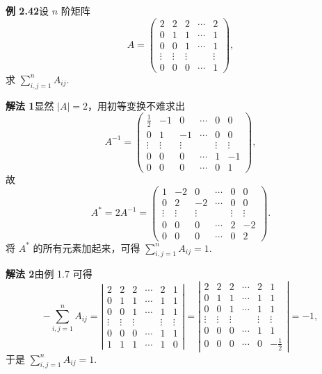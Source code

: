 \documentclass[UTF8,12pt,a4paper,fontset=fandol]{ctexart}
\begin{document}
\noindent\textbf{例 2.42}\quad 设 $n$ 阶矩阵
\[
A=
\left(
\begin{array}{ccccc}
2 & 2 & 2 & \cdots & 2\\
0 & 1 & 1 & \cdots & 1\\
0 & 0 & 1 & \cdots & 1\\
\vdots & \vdots & \vdots & & \vdots\\
0 & 0 & 0 & \cdots & 1
\end{array}
\right),
\]
求 $\sum\limits_{i,j=1}^n A_{ij}$.

\noindent\textbf{解法 1}\quad 显然 $|A|=2$，用初等变换不难求出
\[
A^{-1}=
\left(
\begin{array}{rrrrrr}
\frac12 & -1 & 0 & \cdots & 0 & 0\\
0 & 1 & -1 & \cdots & 0 & 0\\
\vdots & \vdots & \vdots & & \vdots & \vdots\\
0 & 0 & 0 & \cdots & 1 & -1\\
0 & 0 & 0 & \cdots & 0 & 1
\end{array}
\right),
\]
故
\[
A^*=2A^{-1}=
\left(
\begin{array}{rrrrrr}
1 & -2 & 0 & \cdots & 0 & 0\\
0 & 2 & -2 & \cdots & 0 & 0\\
\vdots & \vdots & \vdots & & \vdots & \vdots\\
0 & 0 & 0 & \cdots & 2 & -2\\
0 & 0 & 0 & \cdots & 0 & 2
\end{array}
\right).
\]
将 $A^*$ 的所有元素加起来，可得 $\sum\limits_{i,j=1}^n A_{ij}=1$.

\noindent\textbf{解法 2}\quad 由例 1.7 可得
\[
-\sum_{i,j=1}^n A_{ij}=
\left|
\begin{array}{cccccc}
2 & 2 & 2 & \cdots & 2 & 1\\
0 & 1 & 1 & \cdots & 1 & 1\\
0 & 0 & 1 & \cdots & 1 & 1\\
\vdots & \vdots & \vdots & & \vdots & \vdots\\
0 & 0 & 0 & \cdots & 1 & 1\\
1 & 1 & 1 & \cdots & 1 & 0
\end{array}
\right|
=
\left|
\begin{array}{cccccc}
2 & 2 & 2 & \cdots & 2 & 1\\
0 & 1 & 1 & \cdots & 1 & 1\\
0 & 0 & 1 & \cdots & 1 & 1\\
\vdots & \vdots & \vdots & & \vdots & \vdots\\
0 & 0 & 0 & \cdots & 1 & 1\\
0 & 0 & 0 & \cdots & 0 & -\frac12
\end{array}
\right|
=-1,
\]
于是 $\sum\limits_{i,j=1}^n A_{ij}=1$.
\end{document}
